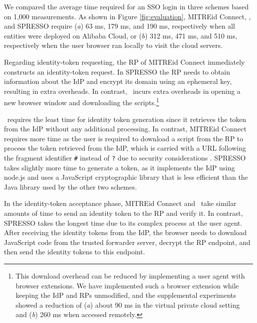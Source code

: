 We compared the average time required for an SSO login in three schemes based on 1,000 measurements. As shown in Figure \ref{fig:evaluation},
MITREid Connect, \usso, and SPRESSO require (\emph{a}) 63 ms, 179 ms, and 190 ms, respectively when all entities were deployed on Alibaba Cloud,
 or (\emph{b}) 312 ms, 471 ms, and 510 ms, respectively when the user browser ran locally to visit the cloud servers.

Regarding identity-token requesting, %
the RP of MITREid Connect immediately constructs an identity-token request. %
In SPRESSO the RP needs to obtain information about the IdP %
and encrypt its domain using an ephemeral key, resulting in extra overheads.
In contrast, \usso\ incurs extra overheads in opening a new browser window and downloading the scripts.\footnote{This download overhead can be reduced %
by implementing a user agent with browser extensions.
We have implemented such a browser extension while keeping the IdP and RPs unmodified, and the supplemental experiments showed a reduction of (\emph{a}) about 90 ms in the virtual private cloud setting and (\emph{b}) 260 ms when accessed remotely.}

\usso\ requires the least time for identity token generation since it retrieves the token from the IdP without any additional processing.
In contrast,
MITREid Connect requires more time as the user is required to download a script from the RP to process the token retrieved from the IdP, which is carried with a URL following the fragment identifier \verb+#+ instead of \verb+?+ due to security considerations \cite{de2014oauth}.
SPRESSO takes slightly more time to generate a token, as it implements the IdP using node.js and uses a JavaScript cryptographic library that is less efficient than the Java library used by the other two schemes.


In the identity-token acceptance phase, MITREid Connect and \usso\ take similar amounts of time to send an identity token to the RP and verify it.
In contrast, SPRESSO takes the longest time due to its complex process at the user agent.
After receiving the identity tokens from the IdP, the browser needs to download JavaScript code from the trusted forwarder server, decrypt the RP endpoint, and then send the identity tokens to this endpoint.


